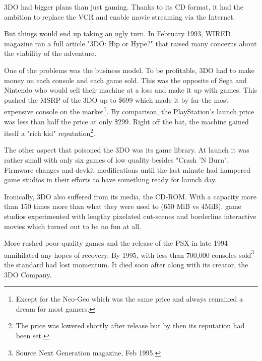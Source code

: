 \par
 3DO had bigger plans than just gaming. Thanks to its CD format, it had the ambition to replace the VCR and enable movie streaming via the Internet.\\
\par
But things would end up taking an ugly turn. In February 1993, WIRED magazine ran a full article "3DO: Hip or Hype?" that raised many concerns about the viability of the adventure.\\
\par
One of the problems was the business model. To be profitable, 3DO had to make money on each console and each game sold. This was the opposite of Sega and Nintendo who would sell their machine at a loss and make it up with games. This pushed the MSRP of the 3DO up to \$699 which made it by far the most expensive console on the market\footnote{Except for the Neo-Geo which was the same price and always remained a dream for most gamers.}. By comparison, the PlayStation's launch price was less than half the price at only \$299. Right off the bat, the machine gained itself a "rich kid" reputation\footnote{The price was lowered shortly after release but by then its reputation had been set.}.\\
\par
The other aspect that poisoned the 3DO was its game library. At launch it was rather small with only six games of low quality besides "Crash 'N Burn". Firmware changes and devkit modifications until the last minute had hampered game studios in their efforts to have something ready for launch day.\\
\par
Ironically, 3DO also suffered from its media, the CD-ROM. With a capacity more than 150 times more than what they were used to (650 MiB vs 4MiB), game studios experimented with lengthy pixelated cut-scenes and borderline interactive movies which turned out to be no fun at all.\\
\par
More rushed poor-quality games and the release of the PSX in late 1994 annihilated any hopes of recovery.
By 1995, with less than 700,000 consoles sold\footnote{Source Next Generation magazine, Feb 1995.} the standard had lost momentum. It died soon after along with its creator, the 3DO Company.






